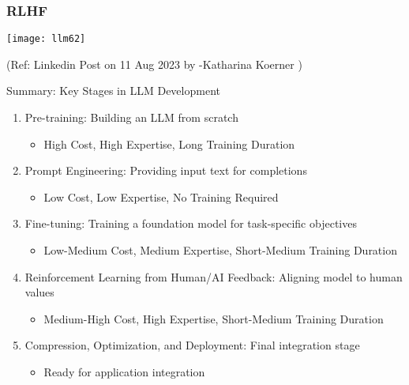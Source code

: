 \begin{frame}[fragile]\frametitle{RLHF}

\begin{center}
\texttt{[image: llm62]}
\end{center}		


{\tiny (Ref: Linkedin Post on 11 Aug 2023 by -Katharina Koerner )}

\end{frame}


\begin{frame}[fragile]{Summary: Key Stages in LLM Development}
    \begin{enumerate}
        \item Pre-training: Building an LLM from scratch
            \begin{itemize}
                \item High Cost, High Expertise, Long Training Duration
            \end{itemize}
        \item Prompt Engineering: Providing input text for completions
            \begin{itemize}
                \item Low Cost, Low Expertise, No Training Required
            \end{itemize}
        \item Fine-tuning: Training a foundation model for task-specific objectives
            \begin{itemize}
                \item Low-Medium Cost, Medium Expertise, Short-Medium Training Duration
            \end{itemize}
        \item Reinforcement Learning from Human/AI Feedback: Aligning model to human values
            \begin{itemize}
                \item Medium-High Cost, High Expertise, Short-Medium Training Duration
            \end{itemize}
        \item Compression, Optimization, and Deployment: Final integration stage
            \begin{itemize}
                \item Ready for application integration
            \end{itemize}
    \end{enumerate}
\end{frame}

